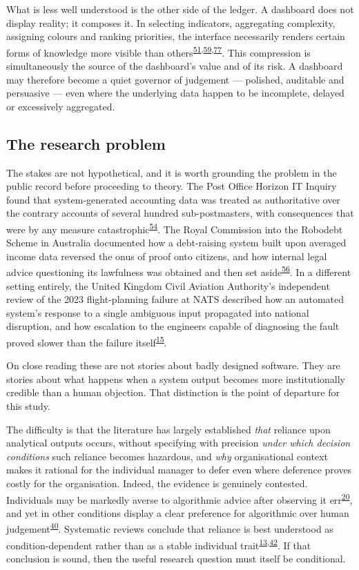 \documentclass[11pt,a4paper]{article}
\numberwithin{figure}{section}
\numberwithin{table}{section}
\begin{document}
What is less well understood is the other side of the ledger. A dashboard does not display reality; it
composes it. In selecting indicators, aggregating complexity, assigning colours and ranking priorities, the
interface necessarily renders certain forms of knowledge more visible than others\textsuperscript{\hyperlink{ref51}{51},\hyperlink{ref59}{59},\hyperlink{ref77}{77}}.
This compression is simultaneously the source of the dashboard's value and of its risk. A dashboard may
therefore become a quiet governor of judgement --- polished, auditable and persuasive --- even where the
underlying data happen to be incomplete, delayed or excessively aggregated.

\subsection{The research problem}

The stakes are not hypothetical, and it is worth grounding the problem in the public record before
proceeding to theory. The Post Office Horizon IT Inquiry found that system-generated accounting data was
treated as authoritative over the contrary accounts of several hundred sub-postmasters, with consequences
that were by any measure catastrophic\textsuperscript{\hyperlink{ref54}{54}}. The Royal Commission into the Robodebt Scheme in
Australia documented how a debt-raising system built upon averaged income data reversed the onus of proof
onto citizens, and how internal legal advice questioning its lawfulness was obtained and then set
aside\textsuperscript{\hyperlink{ref56}{56}}. In a different setting entirely, the United Kingdom Civil Aviation Authority's
independent review of the 2023 flight-planning failure at NATS described how an automated system's response
to a single ambiguous input propagated into national disruption, and how escalation to the engineers
capable of diagnosing the fault proved slower than the failure itself\textsuperscript{\hyperlink{ref15}{15}}.

On close reading these are not stories about badly designed software. They are stories about what happens
when a system output becomes more institutionally credible than a human objection. That distinction is the
point of departure for this study.

The difficulty is that the literature has largely established \emph{that} reliance upon analytical outputs
occurs, without specifying with precision \emph{under which decision conditions} such reliance becomes
hazardous, and \emph{why} organisational context makes it rational for the individual manager to defer even
where deference proves costly for the organisation. Indeed, the evidence is genuinely contested.
Individuals may be markedly averse to algorithmic advice after observing it err\textsuperscript{\hyperlink{ref20}{20}}, and yet in
other conditions display a clear preference for algorithmic over human judgement\textsuperscript{\hyperlink{ref40}{40}}. Systematic
reviews conclude that reliance is best understood as condition-dependent rather than as a stable individual
trait\textsuperscript{\hyperlink{ref13}{13},\hyperlink{ref42}{42}}. If that conclusion is sound, then the useful research question must
itself be conditional.
\end{document}
